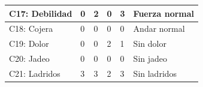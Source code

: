 \documentclass[a4paper,table,xcdraw]{article}
\begin{document}
\begin{longtable}{|l|l|l|l|l|l|}
C17: Debilidad                & 0      & 2          & 0      & 3     & Fuerza normal          \\ \hline
C18: Cojera                   & 0      & 0          & 0      & 0     & Andar normal           \\ \hline
C19: Dolor                    & 0      & 0          & 2      & 1     & Sin dolor              \\ \hline
C20: Jadeo                    & 0      & 0          & 0      & 0     & Sin jadeo              \\ \hline
C21: Ladridos                 & 3      & 3          & 2      & 3     & Sin ladridos           \\ \hline
\end{longtable}

\newpage
\end{document}
